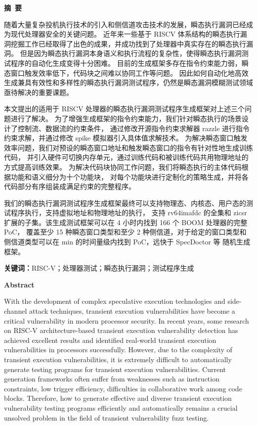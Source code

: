 \cleardoublepage{}
\begin{center}
    \bfseries {} 摘~要
\end{center}

随着大量复杂投机执行技术的引入和侧信道攻击技术的发展，瞬态执行漏洞已经成为现代处理器安全的关键问题。
近年来一些基于 RISCV 体系结构的瞬态执行漏洞挖掘工作已经取得了出色的成果，并成功找到了处理器中真实存在的瞬态执行漏洞。
但是因为瞬态执行漏洞本身语义和执行流程的复杂性，使得瞬态执行漏洞测试程序的自动化生成变得十分困难。
目前的生成框架多存在指令约束能力弱，瞬态窗口触发效率低下，代码块之间难以协同工作等问题。
因此如何自动化地高效生成兼具有效性和多样性的瞬态执行漏洞测试程序，仍然是瞬态漏洞模糊测试领域亟待解决的重要课题。\par

本文提出的适用于 RISCV 处理器的瞬态执行漏洞测试程序生成框架对上述三个问题进行了解决。
为了增强生成框架的指令约束能力，我们针对瞬态执行的场景设计了控制流、数据流的约束条件，
通过修改开源指令约束求解器 razzle 进行指令约束求解，并通过修改 spike 模拟器引入具体值求解技术。
为解决瞬态窗口触发效率问题，我们对预设的瞬态窗口地址和触发瞬态窗口的指令有针对性地生成训练代码，
并引入硬件可切换内存单元，通过训练代码和被训练代码共用物理地址的方式提高训练效果。
为解决代码块协同工作问题，我们将瞬态执行的主体代码根据功能和语义细分为十个功能块，
对每个功能块进行定制化的策略生成，并将各代码部分有序组装成满足约束的完整程序。\par

我们的瞬态执行漏洞测试程序生成框架最终可以支持物理态、内核态、用户态的测试程序执行，支持虚拟地址和物理地址的执行，
支持 rv64imafdc 的全集和 zicsr 扩展的子集。该生成测试框架可以在 4 小时内找到 166 个 BOOM 处理器的完整 PoC，
覆盖至少 15 种瞬态窗口类型和至少 2 种侧信道，对于给定的窗口类型和侧信道类型可以在 min 的时间量级内找到 PoC，远快于 SpecDoctor 等
随机生成框架。\par

\textbf{关键词：}RISC-V；处理器测试；瞬态执行漏洞；测试程序生成

\cleardoublepage{}
\begin{center}
    \bfseries {} Abstract
\end{center}

With the development of complex speculative execution technologies 
and side-channel attack techniques, transient execution vulnerabilities have become a critical vulnerability
in modern processor security. In recent years, 
some research on RISC-V architecture-based transient execution vulnerability detection 
has achieved excellent results and identified real-world transient execution vulnerabilities in processors successfully.
However, due to the complexity of transient execution vulnerabilities, 
it is extremely difficult to automatically generate testing programs for transient execution vulnerabilities.
Current generation frameworks often suffer from weaknesses 
such as instruction constraints, 
low trigger efficiency, difficulties in collaborative work among code blocks. 
Therefore, how to generate effective and diverse transient execution vulnerability testing programs  efficiently and automatically 
remains a crucial unsolved problem in the field of transient vulnerability fuzz testing.\par

